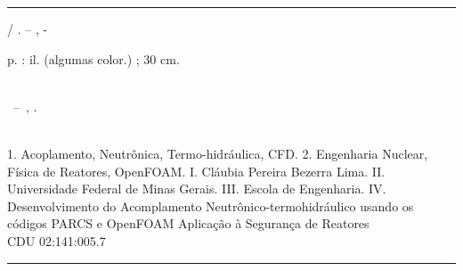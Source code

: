 \documentclass[12pt,openright,twoside,a4paper,english,french,spanish,brazil]{abntex2}
\begin{document}
\frenchspacing 


\imprimircapa

\imprimirfolhaderosto*


%
%     
\begin{fichacatalografica}
	\vspace*{\fill}					%
	\hrule							%
	\begin{center}					%
	\begin{minipage}[c]{12.5cm}		%
	
	\imprimirautor
	
	\hspace{0.5cm} \imprimirtitulo  / \imprimirautor. --
	\imprimirlocal, \imprimirdata-
	
	\hspace{0.5cm} \pageref{LastPage} p. : il. (algumas color.) ; 30 cm.\\
	
	\hspace{0.5cm} \imprimirorientadorRotulo~\imprimirorientador\\
	
	\hspace{0.5cm}
	\parbox[t]{\textwidth}{\imprimirtipotrabalho~--~\imprimirinstituicao,
	\imprimirdata.}\\
	
	\hspace{0.5cm}
		1. Acoplamento, Neutrônica, Termo-hidráulica, CFD.
		2. Engenharia Nuclear, Física de Reatores, OpenFOAM.
		I. Cláubia Pereira Bezerra Lima.
		II. Universidade Federal de Minas Gerais.
		III. Escola de Engenharia.
		IV. Desenvolvimento do Acomplamento Neutrônico-termohidráulico 
                usando os códigos PARCS e OpenFOAM Aplicação à Segurança de Reatores\\ 			
	
	\hspace{8.75cm} CDU 02:141:005.7\\
	
	\end{minipage}
	\end{center}
	\hrule
\end{fichacatalografica}
\end{document}
